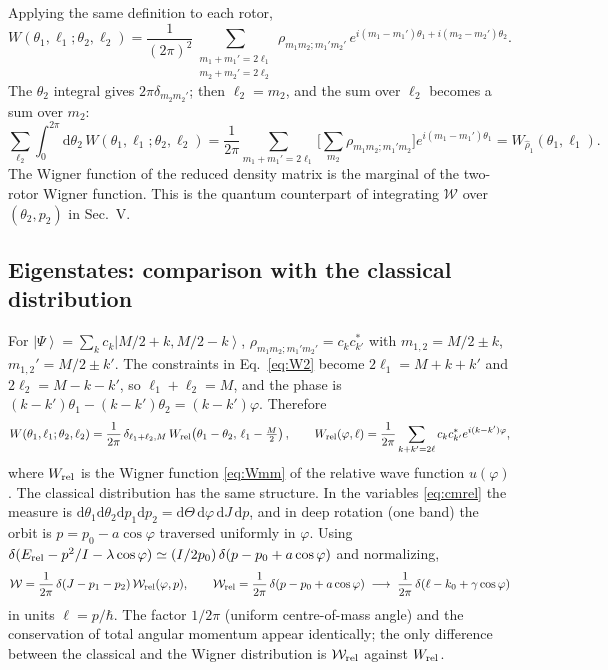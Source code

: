 \documentclass[aps,pra,onecolumn,notitlepage,nofootinbib,11pt]{revtex4-2}
\newcommand{\ket}[1]{\left|#1\right\rangle}
\newcommand{\dd}{\mathrm{d}}
\newcommand{\Erel}{E_{\rm rel}}
\newcommand{\Wc}{\mathcal{W}}
\begin{document}
Applying the same definition to each rotor,
\begin{equation}
W(\theta_{1},\ell_{1};\theta_{2},\ell_{2})=\frac{1}{(2\pi)^{2}}
\sum_{\substack{m_{1}+m_{1}'=2\ell_{1}\\m_{2}+m_{2}'=2\ell_{2}}}
\rho_{m_{1}m_{2};m_{1}'m_{2}'}\,e^{i(m_{1}-m_{1}')\theta_{1}+i(m_{2}-m_{2}')\theta_{2}} .
\label{eq:W2}
\end{equation}
The $\theta_{2}$ integral gives $2\pi\delta_{m_{2}m_{2}'}$; then $\ell_{2}=m_{2}$, and the sum
over $\ell_{2}$ becomes a sum over $m_{2}$:
\begin{equation}
\sum_{\ell_{2}}\int_{0}^{2\pi}\dd\theta_{2}\,W(\theta_{1},\ell_{1};\theta_{2},\ell_{2})
=\frac{1}{2\pi}\sum_{m_{1}+m_{1}'=2\ell_{1}}\Big[\sum_{m_{2}}\rho_{m_{1}m_{2};m_{1}'m_{2}}\Big]
e^{i(m_{1}-m_{1}')\theta_{1}}=W_{\hat\rho_{1}}(\theta_{1},\ell_{1}).
\label{eq:Wmarg}
\end{equation}
The Wigner function of the reduced density matrix is the marginal of the two-rotor
Wigner function. This is the quantum counterpart of integrating $\Wc$ over $(\theta_{2},p_{2})$
in Sec.~V.

\subsection{Eigenstates: comparison with the classical distribution}

For $\ket\Psi=\sum_{k}c_{k}\ket{M/2+k,M/2-k}$, $\rho_{m_{1}m_{2};m_{1}'m_{2}'}=c_{k}c_{k'}^{*}$
with $m_{1,2}=M/2\pm k$, $m_{1,2}'=M/2\pm k'$. The constraints in Eq.~\eqref{eq:W2}
become $2\ell_{1}=M+k+k'$ and $2\ell_{2}=M-k-k'$, so $\ell_{1}+\ell_{2}=M$, and the phase
is $(k-k')\theta_{1}-(k-k')\theta_{2}=(k-k')\varphi$. Therefore
\begin{equation}
W(\theta_{1},\ell_{1};\theta_{2},\ell_{2})=\frac{1}{2\pi}\,\delta_{\ell_{1}+\ell_{2},M}\,
W_{\rm rel}\!\left(\theta_{1}-\theta_{2},\,\ell_{1}-\tfrac{M}{2}\right),\qquad
W_{\rm rel}(\varphi,\ell)=\frac{1}{2\pi}\sum_{k+k'=2\ell}c_{k}c_{k'}^{*}e^{i(k-k')\varphi},
\label{eq:Wfactor}
\end{equation}
where $W_{\rm rel}$ is the Wigner function \eqref{eq:Wmm} of the relative wave function
$u(\varphi)$. The classical distribution has the same structure. In the variables
\eqref{eq:cmrel} the measure is $\dd\theta_{1}\dd\theta_{2}\dd p_{1}\dd p_{2}=\dd\Theta\,
\dd\varphi\,\dd J\,\dd p$, and in deep rotation (one band) the orbit is
$p=p_{0}-a\cos\varphi$ traversed uniformly in $\varphi$. Using
$\delta(\Erel-p^{2}/I-\lambda\cos\varphi)\simeq(I/2p_{0})\,\delta(p-p_{0}+a\cos\varphi)$
and normalizing,
\begin{equation}
\Wc=\frac{1}{2\pi}\,\delta(J-p_{1}-p_{2})\,\Wc_{\rm rel}(\varphi,p),\qquad
\Wc_{\rm rel}=\frac{1}{2\pi}\,\delta(p-p_{0}+a\cos\varphi)
\;\longrightarrow\;\frac{1}{2\pi}\,\delta(\ell-k_{0}+\gamma\cos\varphi)
\label{eq:Wclrel}
\end{equation}
in units $\ell=p/\hbar$. The factor $1/2\pi$ (uniform centre-of-mass angle) and the
conservation of total angular momentum appear identically; the only difference
between the classical and the Wigner distribution is $\Wc_{\rm rel}$ against $W_{\rm rel}$.
\end{document}
